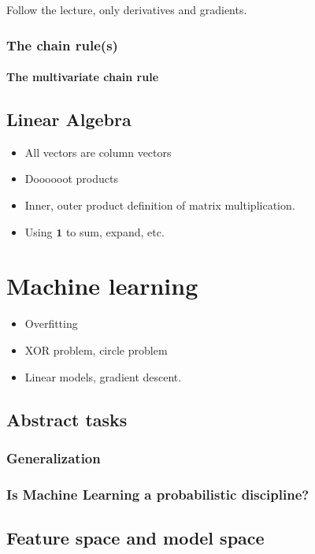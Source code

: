 \documentclass{pca}
\newcommand{\one}{\mathbold 1}
\theoremstyle{theorem}
\theoremstyle{definition}
\theoremstyle{proof}
\begin{document}
Follow the lecture, only derivatives and gradients.

\subsection{The chain rule(s)}
\subsubsection{The multivariate chain rule}

\section{Linear Algebra}

\begin{itemize}
\item All vectors are column vectors
\item Doooooot products
\item Inner, outer product definition of matrix multiplication.	
\item Using $\one$ to sum, expand, etc.
\end{itemize}

\chapter{Machine learning}

\begin{itemize}
	\item Overfitting
	\item XOR problem, circle problem
	\item Linear models, gradient descent.
\end{itemize}

\section{Abstract tasks}

\subsection{Generalization}
\subsection{Is Machine Learning a probabilistic discipline?}
\section{Feature space and model space}
\end{document}

